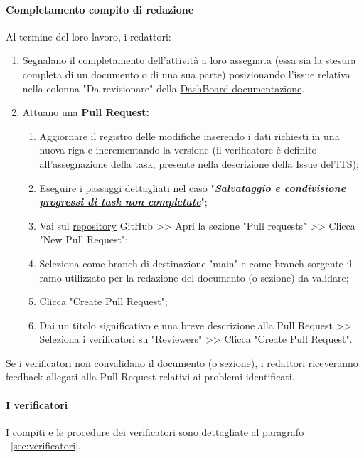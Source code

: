 \vspace{0.3cm}

\paragraph*{\textbf{Completamento compito di redazione}}
Al termine del loro lavoro, i redattori:
\begin{enumerate}
    \item Segnalano il completamento dell'attività a loro assegnata (essa sia la stesura completa di un documento o di una sua parte) posizionando l'issue relativa nella colonna "Da revisionare" della \href{https://github.com/orgs/ByteOps-swe/projects/1/views/1}{DashBoard documentazione}.
    \item Attuano una \hyperlink{par:creazionePR}{\textbf{Pull Request:}}
          \begin{enumerate}
              \item Aggiornare il registro delle modifiche inserendo i dati richiesti in  una nuova riga e incrementando la versione (il verificatore è definito all'assegnazione della task, presente nella descrizione della Issue del'ITS);
              \item Eseguire i passaggi dettagliati nel caso "\hyperlink{par:salvataggioecondivisioneprogressitasknoncompletate}{\textit{\textbf{Salvataggio e condivisione progressi di task non completate}}}";
              \item Vai sul \href{https://github.com/ByteOps-swe/Sorgente-documenti.git}{repository} GitHub >> Apri la sezione "Pull requests" >> Clicca "New Pull Request";
              \item Seleziona come branch di destinazione "main" e come branch sorgente il ramo utilizzato per la redazione del documento (o sezione) da validare;
              \item Clicca "Create Pull Request";
              \item Dai un titolo significativo e una breve descrizione alla Pull Request >> Seleziona i verificatori su "Reviewers" >> Clicca "Create Pull Request".
          \end{enumerate}
\end{enumerate}

Se i verificatori non convalidano il documento (o sezione), i redattori riceveranno feedback allegati alla Pull Request relativi ai problemi identificati.

\paragraph{I verificatori}
I compiti e le procedure dei verificatori sono dettagliate al paragrafo ~\ref{sec:verificatori}.

